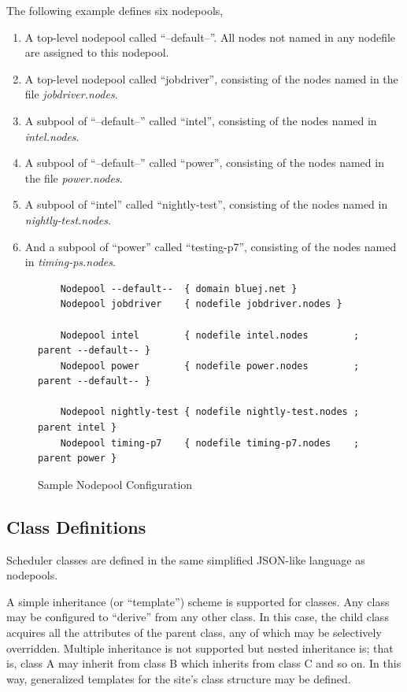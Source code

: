     The following example defines six nodepools, 
    \begin{enumerate}
      \item A top-level nodepool called ``--default--''.  All nodes not named
        in any nodefile are assigned to this nodepool.
      \item A top-level nodepool called ``jobdriver'', consisting of the nodes
        named in the file {\em jobdriver.nodes}.
      \item A subpool of ``--default--'' called ``intel'', consisting of the
        nodes named in {\em intel.nodes}.
      \item A subpool of ``--default--'' called ``power'', consisting of the
        nodes named in the file {\em power.nodes}.
      \item A subpool of ``intel'' called ``nightly-test'', consisting of the 
        nodes named in {\em nightly-test.nodes}.
      \item And a subpool of ``power'' called ``testing-p7'', consisting of the
        nodes named in {\em timing-ps.nodes}.
    \end{enumerate}

    \begin{figure}[H]
    
\begin{verbatim}
    Nodepool --default--  { domain bluej.net }
    Nodepool jobdriver    { nodefile jobdriver.nodes }
    
    Nodepool intel        { nodefile intel.nodes        ; parent --default-- }
    Nodepool power        { nodefile power.nodes        ; parent --default-- }

    Nodepool nightly-test { nodefile nightly-test.nodes ; parent intel }
    Nodepool timing-p7    { nodefile timing-p7.nodes    ; parent power }
\end{verbatim}
      \caption{Sample Nodepool Configuration}
      \label{fig:nodepool.configuration}

    \end{figure}    


    \subsection{Class Definitions}

    Scheduler classes are defined in the same simplified JSON-like language as
    nodepools.

    A simple inheritance (or ``template'') scheme is supported for classes.  Any
    class may be configured to ``derive'' from any other class.  In this case, the
    child class acquires all the attributes of the parent class, any of which may
    be selectively overridden.  Multiple inheritance is not supported but
    nested inheritance is; that is, class A may inherit from class B which inherits
    from class C and so on. In this way, generalized templates for the site's
    class structure may be defined.  

